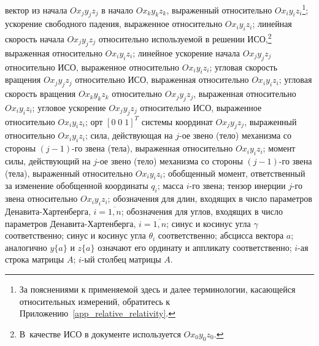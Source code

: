 \begin{itemize}
 вектор из начала $Ox_{j}y_{j}z_{j}$ в начало $Ox_{k}y_{k}z_{k}$, выраженный относительно $Ox_{i}y_{i}z_{i}$\footnote{За пояснениями к применяемой здесь и далее терминологии, касающейся относительных измерений, обратитесь к Приложению~\ref{app_relative_relativity}.};
 ускорение свободного падения, выраженное относительно $Ox_{i}y_{i}z_{i}$;
 линейная скорость начала $Ox_{j}y_{j}z_{j}$ относительно используемой в решении ИСО\lefteqn,\footnote{В~качестве ИСО в документе используется $Ox_0y_0z_0$.} выраженная относительно $Ox_{i}y_{i}z_{i}$;
 линейное ускорение начала $Ox_{j}y_{j}z_{j}$ относительно ИСО, выраженное относительно $Ox_{i}y_{i}z_{i}$;
 угловая скорость вращения $Ox_{j}y_{j}z_{j}$ относительно ИСО, выраженная относительно $Ox_{i}y_{i}z_{i}$;
 угловая скорость вращения $Ox_{k}y_{k}z_{k}$ относительно $Ox_{j}y_{j}z_{j}$, выраженная относительно $Ox_{i}y_{i}z_{i}$;
 угловое ускорение $Ox_{j}y_{j}z_{j}$ относительно ИСО, выраженное относительно $Ox_{i}y_{i}z_{i}$;
 орт $[0\;0\;1]^T$ системы координат $Ox_{j}y_{j}z_{j}$, выраженный относительно $Ox_{i}y_{i}z_{i}$;
 сила, действующая на $j$-ое звено (тело) механизма со стороны $(j-1)$-го звена (тела), выраженная относительно $Ox_{i}y_{i}z_{i}$;
 момент силы, действующий на $j$-ое звено (тело) механизма со стороны ${(j-1)}$-го звена (тела), выраженный относительно $Ox_{i}y_{i}z_{i}$;
 обобщенный момент, ответственный за изменение обобщенной координаты $q_i$;
 масса $i$-го звена;
 тензор инерции $j$-го звена относительно $Ox_{i}y_{i}z_{i}$;
 обозначения для длин, входящих в число параметров Де\-на\-ви\-та-Хар\-тен\-бер\-га, $i=\overline{1,n}$;
 обозначения для углов, входящих в число параметров Де\-на\-ви\-та-Хар\-тен\-бер\-га, $i=\overline{1,n}$;
 синус и косинус угла $\gamma$ соответственно;
 синус и косинус угла $\theta_i$ соответственно;
 абсцисса вектора $a$; аналогично $y\{a\}$ и $z\{a\}$ означают его ординату и аппликату соответственно;
 $i$-ая строка матрицы $A$;
 $i$-ый столбец матрицы $A$.
\end{itemize}
\newpage